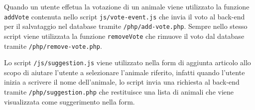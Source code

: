 Quando un utente effetua la votazione di un animale viene utilizzato la funzione \texttt{addVote} contenuta nello script \texttt{js/vote-event.js} che invia il voto al back-end per il salvataggio nel database tramite \texttt{/php/add-vote.php}.
Sempre nello stesso script viene utilizzata la funzione \texttt{removeVote} che rimuove il voto dal database tramite \texttt{/php/remove-vote.php}.

Lo script \texttt{/js/suggestion.js} viene utilizzato nella form di aggiunta articolo allo scopo di aiutare l'utente a selezionare l'animale riferito,
infatti quando l'utente inizia a scrivere il nome dell'animale, lo script invia una richiesta al back-end tramite \texttt{/php/suggestion.php} che restituisce una lista di animali che viene visualizzata come suggerimento nella form.

